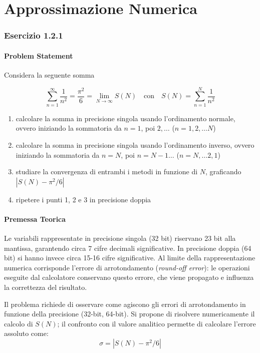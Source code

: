\documentclass[11pt, a4paper]{article}
\begin{document}
\part{\Huge Approssimazione Numerica}

\section{Esercizio 1.2.1}
\label{sec: basilea}

\subsection{Problem Statement}
Considera la seguente somma

\[
\sum_{n=1}^{\infty} \frac{1}{n^2} = \frac{\pi^2}{6} = \lim_{N \to \infty} S(N) \quad \text{con} \quad S(N) = \sum_{n=1}^{N} \frac{1}{n^2}
\]


\begin{enumerate}
    \item calcolare la somma in precisione singola usando l'ordinamento normale, ovvero iniziando la sommatoria da $n = 1$, poi $2, \dots$ ($n = 1, 2, \dots N$)
    \item calcolare la somma in precisione singola usando l'ordinamento inverso, ovvero iniziando la sommatoria da $n = N$, poi $n = N - 1 \dots$ ($n = N, \dots 2, 1$)
    \item studiare la convergenza di entrambi i metodi in funzione di $N$, graficando $|S(N) - \pi^2/6|$
    \item ripetere i punti 1, 2 e 3 in precisione doppia
\end{enumerate}

\subsection{Premessa Teorica}
Le variabili rappresentate in precisione singola (32 bit) riservano 23 bit alla mantissa, garantendo circa 7 cifre decimali significative. In precisione doppia (64 bit) si hanno invece circa 15-16 cifre significative. Al limite della rappresentazione numerica corrisponde l'errore di arrotondamento (\textit{round-off error}): le operazioni eseguite dal calcolatore conservano questo errore, che viene propagato e influenza la correttezza del risultato.

Il problema richiede di osservare come agiscono gli errori di arrotondamento in funzione della precisione (32-bit, 64-bit). Si propone di risolvere numericamente il calcolo di $S(N)$; il confronto con il valore analitico permette di calcolare l'errore assoluto come:
\[
    \sigma = |S(N) - \pi^2/6|
\]
\end{document}
